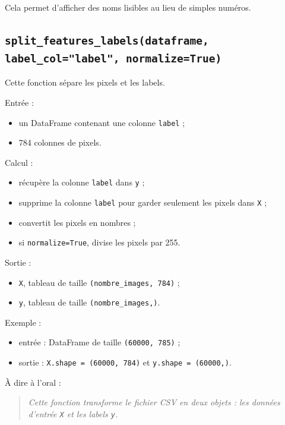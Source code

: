 \documentclass[11pt,a4paper]{article}
\begin{document}
Cela permet d'afficher des noms lisibles au lieu de simples numéros.

\subsection{\texttt{split\_features\_labels(dataframe, label\_col="label", normalize=True)}}

Cette fonction sépare les pixels et les labels.

Entrée :

\begin{itemize}
\item un DataFrame contenant une colonne \texttt{label} ;
\item 784 colonnes de pixels.
\end{itemize}

Calcul :

\begin{itemize}
\item récupère la colonne \texttt{label} dans \texttt{y} ;
\item supprime la colonne \texttt{label} pour garder seulement les pixels dans \texttt{X} ;
\item convertit les pixels en nombres ;
\item si \texttt{normalize=True}, divise les pixels par 255.
\end{itemize}

Sortie :

\begin{itemize}
\item \texttt{X}, tableau de taille \texttt{(nombre\_images, 784)} ;
\item \texttt{y}, tableau de taille \texttt{(nombre\_images,)}.
\end{itemize}

Exemple :

\begin{itemize}
\item entrée : DataFrame de taille \texttt{(60000, 785)} ;
\item sortie : \texttt{X.shape = (60000, 784)} et \texttt{y.shape = (60000,)}.
\end{itemize}

À dire à l'oral :

\begin{quote}
\itshape Cette fonction transforme le fichier CSV en deux objets : les données d'entrée \texttt{X} et les labels \texttt{y}.
\end{quote}
\end{document}
